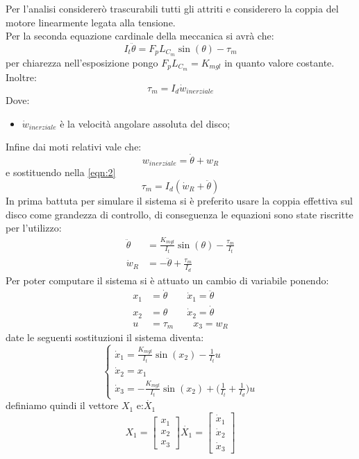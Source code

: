 \documentclass[12pt,a4paper,twoside, openright]{scrartcl}
\newcommand{\thetap}{\dot{\theta}}
\newcommand{\thetapp}{\ddot{\theta}}
\newcommand{\Xu}{X_1}
\newcommand{\Xup}{\dot{X_1}}
\newcommand{\xu}{x_1}
\newcommand{\xd}{x_2}
\newcommand{\xt}{x_3}
\newcommand{\xup}{\dot{x}_1}
\newcommand{\xdp}{\dot{x}_2}
\newcommand{\xtp}{\dot{x}_3}
\begin{document}
	Per l'analisi considererò trascurabili tutti gli attriti e considerero la coppia del motore linearmente legata alla tensione.\\
	Per la seconda equazione cardinale della meccanica si avrà che:
	\begin{equation}
		\label{eqn:1}
		I_t\thetapp=F_p L_{C_m}\sin(\theta)- \tau_m
	\end{equation}
	per chiarezza nell'esposizione pongo $F_p L_{C_m}=K_{mgl}$ in quanto valore costante.
	Inoltre:
	\begin{equation}
		\label{eqn:2} 
	 	\tau_m =I_d \dot{w}_{inerziale}
	 \end{equation}
	Dove:
	\begin{itemize}
		\item $\dot{w}_{inerziale}$ è la velocità angolare assoluta del disco;
	\end{itemize}
	Infine dai moti relativi vale che:
	\begin{equation}
		\label{eqn:4}
		w_{inerziale}=\thetap+w_R 
	\end{equation}
	e sostituendo nella \ref{eqn:2}
	\begin{equation}
		\label{eqn:5}
		\tau_m =I_d (\dot{w}_{R}+\thetapp)
	\end {equation}
	In prima battuta per simulare il sistema si è preferito usare la coppia effettiva sul disco come grandezza di controllo, di conseguenza le equazioni sono state riscritte per l'utilizzo:
\begin{align}
	\thetapp&=\frac{K_{mgl}}{I_t}\sin(\theta) -\frac{\tau_m}{I_t} \label{eqn:6}\\
	\dot{w}_R&=-\thetapp + \frac{\tau_m}{I_d} \label{eqn:7}
\end{align}
	Per poter computare il sistema si è attuato un cambio di variabile ponendo:
\begin{align}
\xu&=\thetap\qquad	  \xup=\thetapp  \label{eqn:8}\\
\xd&=\theta 	\qquad	  \xdp=\thetap \label{eqn:9}\\
u&=\tau_m \qquad \xt=w_R \label{eqn:10}
\end{align}
	date le seguenti sostituzioni il sistema diventa:
\begin{equation}
	\label{sis:1}
	\begin{cases}
		\xup=\frac{K_{mgl}}{I_t}\sin(\xd) -\frac{1}{I_t}u   \\
		\xdp=\xu\\
		\xtp=-\frac{K_{mgl}}{I_t}\sin(\xd) +\big(\frac{1}{I_t}+\frac{1}{I_d}\big)u 
	\end{cases}
\end{equation}
	definiamo quindi il vettore $\Xu $ e:$\Xup$
\begin{equation}
\Xu =
\begin{bmatrix}
\xu \\
\xd \\
\xt
\end{bmatrix}
\Xup =
\begin{bmatrix}
\xup \\
\xdp \\
\xtp
\end{bmatrix}
\end{equation}
\end{document}
